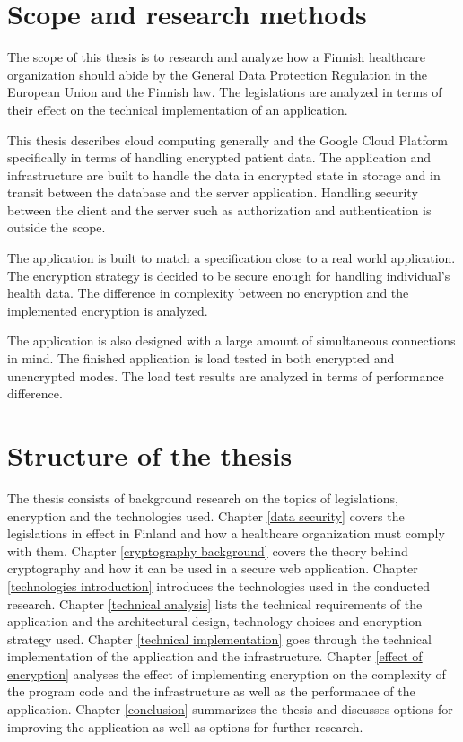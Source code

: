 \section{Scope and research methods}

The scope of this thesis is to research and analyze how a Finnish healthcare organization should abide by the General Data Protection Regulation in the European Union and the Finnish law.
The legislations are analyzed in terms of their effect on the technical implementation of an application.

This thesis describes cloud computing generally and the Google Cloud Platform specifically in terms of handling encrypted patient data.
The application and infrastructure are built to handle the data in encrypted state in storage and in transit between the database and the server application.
Handling security between the client and the server such as authorization and authentication is outside the scope.

The application is built to match a specification close to a real world application.
The encryption strategy is decided to be secure enough for handling individual's health data.
The difference in complexity between no encryption and the implemented encryption is analyzed.

The application is also designed with a large amount of simultaneous connections in mind.
The finished application is load tested in both encrypted and unencrypted modes.
The load test results are analyzed in terms of performance difference.

\section{Structure of the thesis}

The thesis consists of background research on the topics of legislations, encryption and the technologies used.
Chapter \ref{data security} covers the legislations in effect in Finland and how a healthcare organization must comply with them.
Chapter \ref{cryptography background} covers the theory behind cryptography and how it can be used in a secure web application.
Chapter \ref{technologies introduction} introduces the technologies used in the conducted research.
Chapter \ref{technical analysis} lists the technical requirements of the application and the architectural design, technology choices and encryption strategy used.
Chapter \ref{technical implementation} goes through the technical implementation of the application and the infrastructure.
Chapter \ref{effect of encryption} analyses the effect of implementing encryption on the complexity of the program code and the infrastructure as well as the performance of the application.
Chapter \ref{conclusion} summarizes the thesis and discusses options for improving the application as well as options for further research.
